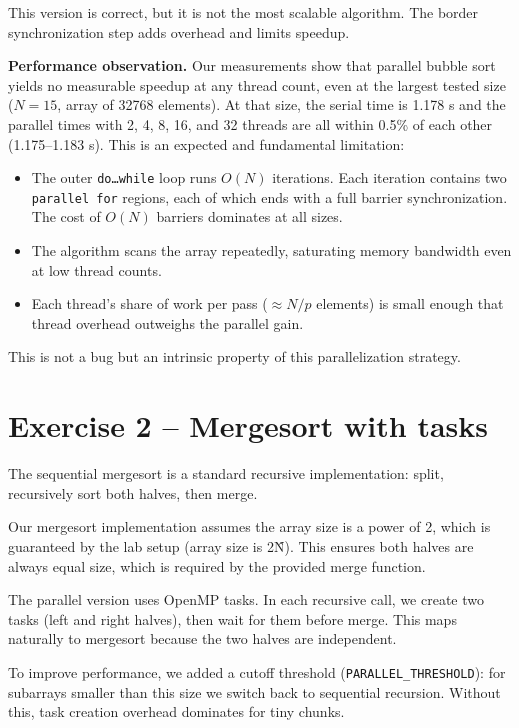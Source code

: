 \documentclass[11pt,a4paper]{article}
\begin{document}
This version is correct, but it is not the most scalable algorithm. The border synchronization step adds overhead and limits speedup.

\textbf{Performance observation.}
Our measurements show that parallel bubble sort yields no measurable speedup at any thread count, even at the largest tested size ($N=15$, array of 32768 elements). At that size, the serial time is 1.178 s and the parallel times with 2, 4, 8, 16, and 32 threads are all within 0.5\% of each other (1.175--1.183 s). This is an expected and fundamental limitation:
\begin{itemize}
    \item The outer \texttt{do\ldots while} loop runs $O(N)$ iterations. Each iteration contains two \texttt{parallel for} regions, each of which ends with a full barrier synchronization. The cost of $O(N)$ barriers dominates at all sizes.
    \item The algorithm scans the array repeatedly, saturating memory bandwidth even at low thread counts.
    \item Each thread's share of work per pass ($\approx N/p$ elements) is small enough that thread overhead outweighs the parallel gain.
\end{itemize}
This is not a bug but an intrinsic property of this parallelization strategy.

\section{Exercise 2 -- Mergesort with tasks}
The sequential mergesort is a standard recursive implementation: split, recursively sort both halves, then merge.

Our mergesort implementation assumes the array size is a power of 2, which is guaranteed by the lab setup (array size is 2\^N). This ensures both halves are always equal size, which is required by the provided merge function.

The parallel version uses OpenMP tasks. In each recursive call, we create two tasks (left and right halves), then wait for them before merge. This maps naturally to mergesort because the two halves are independent.

To improve performance, we added a cutoff threshold (\texttt{PARALLEL\_THRESHOLD}): for subarrays smaller than this size we switch back to sequential recursion. Without this, task creation overhead dominates for tiny chunks.
\end{document}
